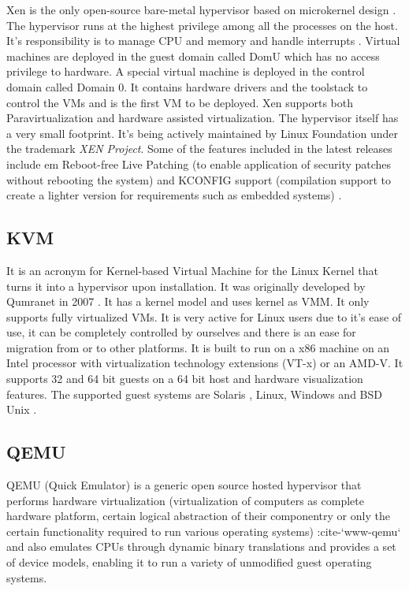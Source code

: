 {     Xen is the only open-source bare-metal hypervisor based on
     microkernel design \cite{www-xen-wikipedia}. The hypervisor runs
     at the highest privilege among all the processes on the
     host. It's responsibility is to manage CPU and memory and handle
     interrupts \cite{www-xen-overview}. Virtual machines are
     deployed in the guest domain called DomU which has no access
     privilege to hardware. A special virtual machine is deployed in
     the control domain called Domain 0. It contains hardware drivers
     and the toolstack to control the VMs and is the first VM to be
     deployed. Xen supports both Paravirtualization and hardware
     assisted virtualization. The hypervisor itself has a very small
     footprint. It's being actively maintained by Linux Foundation
     under the trademark \textit{XEN Project}. Some of the features included
     in the latest releases include {em Reboot-free Live Patching} (to
     enable application of security patches without rebooting the
     system) and KCONFIG support (compilation support to create a
     lighter version for requirements such as embedded systems)
     \cite{www-xen-fl}.
          
\subsection{KVM}

     It is an acronym for Kernel-based Virtual Machine for the Linux
     Kernel that turns it into a hypervisor upon installation. It was
     originally developed by Qumranet in 2007 \cite{www-KVM-wiki}. It
     has a kernel model and uses kernel as VMM. It only supports fully
     virtualized VMs. It is very active for Linux users due to it’s
     ease of use, it can be completely controlled by ourselves and
     there is an ease for migration from or to other platforms. It is
     built to run on a x86 machine on an Intel processor with
     virtualization technology extensions (VT-x) or an AMD-V. It
     supports 32 and 64 bit guests on a 64 bit host and hardware
     visualization features. The supported guest systems are Solaris ,
     Linux, Windows and BSD Unix \cite{www-KVM-webpage}.

\subsection{QEMU \cv}
     
     QEMU (Quick Emulator) is a generic open source hosted hypervisor
     \cite{www-hypervisor} that performs hardware virtualization
     (virtualization of computers as complete hardware platform,
     certain logical abstraction of their componentry or only the
     certain functionality required to run various operating systems)
     :cite-`www-qemu` and also emulates CPUs through dynamic binary
     translations and provides a set of device models, enabling it to
     run a variety of unmodified guest operating systems.
     
}
